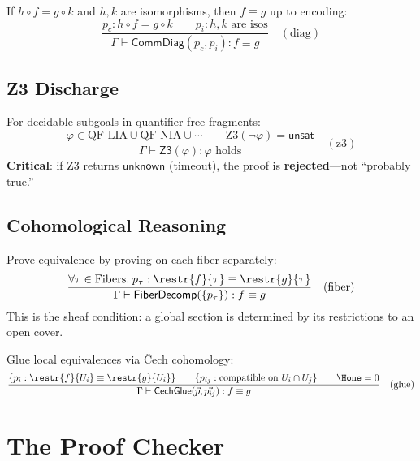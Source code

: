 \begin{definition}
If $h \circ f = g \circ k$ and $h, k$ are isomorphisms, then $f \equiv g$
up to encoding:
\[
\frac{p_c : h \circ f = g \circ k \qquad p_i : h, k \text{ are isos}}
     {\Gamma \vdash \mathsf{CommDiag}(p_c, p_i) : f \equiv g}
     \quad (\text{diag})
\]
\end{definition}

\subsection{Z3 Discharge}

\begin{definition}[Z3 Discharge]
For decidable subgoals in quantifier-free fragments:
\[
\frac{\varphi \in \mathrm{QF\_LIA} \cup \mathrm{QF\_NIA} \cup \cdots \qquad
      \mathrm{Z3}(\neg\varphi) = \mathsf{unsat}}
     {\Gamma \vdash \mathsf{Z3}(\varphi) : \varphi \text{ holds}}
     \quad (\text{z3})
\]
\textbf{Critical}: if Z3 returns $\mathsf{unknown}$ (timeout), the proof is
\textbf{rejected}---not ``probably true.''
\end{definition}

\subsection{Cohomological Reasoning}

\begin{definition}
Prove equivalence by proving on each fiber separately:
\[
\frac{\forall \tau \in \mathrm{Fibers}.\;
      p_\tau : \restr{f}{\tau} \equiv \restr{g}{\tau}}
     {\Gamma \vdash \mathsf{FiberDecomp}(\{p_\tau\})
       : f \equiv g}
     \quad (\text{fiber})
\]
This is the sheaf condition: a global section is determined by its
restrictions to an open cover.
\end{definition}

\begin{definition}
Glue local equivalences via \v{C}ech cohomology:
\[
\frac{\{p_i : \restr{f}{U_i} \equiv \restr{g}{U_i}\} \qquad
      \{p_{ij} : \text{compatible on } U_i \cap U_j\} \qquad
      \Hone = 0}
     {\Gamma \vdash \mathsf{CechGlue}(\vec{p}, \vec{p_{ij}})
       : f \equiv g}
     \quad (\text{glue})
\]
\end{definition}


\section{The Proof Checker}

